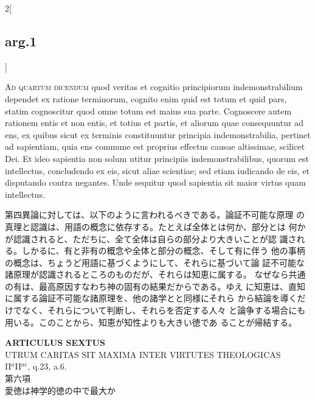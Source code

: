 \documentclass[paper=a4paper,fontsize=10pt,jafontsize=9pt,titlepage]{jlreq}
\begin{document}
\begin{paracol}{2}[\subsection{arg.1}]
\switchcolumn*[\subsection{ad.4}]

{\scshape Ad quartum dicendum} quod veritas et cognitio principiorum
indemonstrabilium dependet ex ratione terminorum, cognito enim quid
est totum et quid pars, statim cognoscitur quod omne totum est maius
sua parte. Cognoscere autem rationem entis et non entis, et totius et
partis, et aliorum quae consequuntur ad ens, ex quibus sicut ex
terminis constituuntur principia indemonstrabilia, pertinet ad
sapientiam, quia ens commune est proprius effectus causae altissimae,
scilicet Dei. Et ideo sapientia non solum utitur principiis
indemonstrabilibus, quorum est intellectus, concludendo ex eis, sicut
aliae scientiae; sed etiam iudicando de eis, et disputando contra
negantes. Unde sequitur quod sapientia sit maior virtus quam
intellectus.

\switchcolumn

第四異論に対しては、以下のように言われるべきである。論証不可能な原理
 の真理と認識は、用語の概念に依存する。たとえば全体とは何か、部分とは
 何かが認識されると、ただちに、全て全体は自らの部分より大きいことが認
 識される。しかるに、有と非有の概念や全体と部分の概念、そして有に伴う
 他の事柄の概念は、ちょうど用語に基づくようにして、それらに基づいて論
 証不可能な諸原理が認識されるところのものだが、それらは知恵に属する。
 なぜなら共通の有は、最高原因すなわち神の固有の結果だからである。ゆえ
 に知恵は、直知に属する論証不可能な諸原理を、他の諸学とと同様にそれら
 から結論を導くだけでなく、それらについて判断し、それらを否定する人々
 と論争する場合にも用いる。このことから、知恵が知性よりも大きい徳であ
 ることが帰結する。

\end{paracol}
\newpage
{}
{}
\setcounter{section}{6}
\setcounter{subsection}{0}






\begin{center}
{\Large {\bfseries ARTICULUS SEXTUS}}\\
{\large UTRUM CARITAS SIT MAXIMA INTER VIRTUTES THEOLOGICAS}\\
{\footnotesize II$^{a}$II$^{ae}$, q.23, a.6.}\\
{\Large 第六項\\愛徳は神学的徳の中で最大か}
\end{center}
\end{document}

